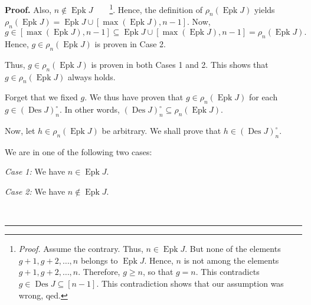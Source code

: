 \documentclass[numbers=enddot,12pt,final,onecolumn,notitlepage]{scrartcl}%
\theoremstyle{definition}
\newenvironment{proof}[1][Proof]{\noindent\textbf{#1.} }{\ \rule{0.5em}{0.5em}}
\newenvironment{verlong}{}{}
\begin{document}
\begin{verlong}
\begin{proof}
Also, $n\notin\operatorname{Epk}J$\ \ \ \ \footnote{\textit{Proof.} Assume
the contrary. Thus, $n\in\operatorname{Epk}J$. But none of the elements
$g+1,g+2,\ldots,n$ belongs to $\operatorname{Epk}J$. Hence, $n$ is not among
the elements $g+1,g+2,\ldots,n$. Therefore, $g\geq n$, so that $g=n$. This
contradicts $g\in\operatorname{Des}J\subseteq\left[  n-1\right]  $. This
contradiction shows that our assumption was wrong, qed.}. Hence, the
definition of $\rho_{n}\left(  \operatorname{Epk}J\right)  $ yields $\rho
_{n}\left(  \operatorname{Epk}J\right)  =\operatorname{Epk}J\cup\left[
\max\left(  \operatorname{Epk}J\right)  ,n-1\right]  $. Now,%
\[
g\in\left[  \max\left(  \operatorname{Epk}J\right)  ,n-1\right]
\subseteq\operatorname{Epk}J\cup\left[  \max\left(  \operatorname{Epk}
J\right)  ,n-1\right]  =\rho_{n}\left(  \operatorname{Epk}J\right)  .
\]
Hence, $g\in\rho_{n}\left(  \operatorname{Epk}J\right)  $ is proven in Case 2.

Thus, $g\in\rho_{n}\left(  \operatorname{Epk}J\right)  $ is proven in both
Cases 1 and 2. This shows that $g\in\rho_{n}\left(  \operatorname{Epk}
J\right)  $ always holds.

Forget that we fixed $g$. We thus have proven that $g\in\rho_{n}\left(
\operatorname{Epk}J\right)  $ for each $g\in\left(  \operatorname{Des}
J\right)  _{n}^{\circ}$. In other words, $\left(  \operatorname{Des}J\right)
_{n}^{\circ}\subseteq\rho_{n}\left(  \operatorname{Epk}J\right)  $.

Now, let $h\in\rho_{n}\left(  \operatorname{Epk}J\right)  $ be arbitrary. We
shall prove that $h\in\left(  \operatorname{Des}J\right)  _{n}^{\circ}$.

We are in one of the following two cases:

\textit{Case 1:} We have $n\in\operatorname{Epk}J$.

\textit{Case 2:} We have $n\notin\operatorname{Epk}J$.


\end{proof}
\end{verlong}
\end{document}
